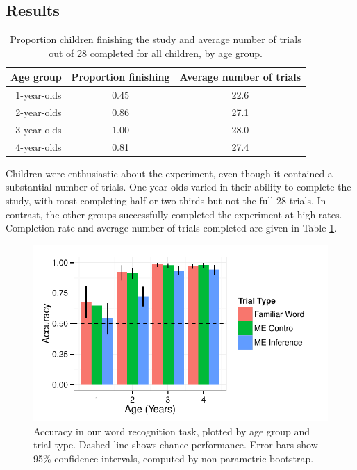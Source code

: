 \documentclass[man,noapacite]{apa2}
\begin{document}
\subsection{Results}


\begin{table}[t]
\centering
\caption{Proportion children finishing the study and average number of trials out of 28 completed for all children, by age group.\label{tab:completion}}

\begin{tabular}{rcc}
  \hline
Age group & Proportion finishing & Average number of trials \\ 
  \hline
1-year-olds & 0.45 & 22.6 \\ 
2-year-olds & 0.86 & 27.1 \\ 
3-year-olds & 1.00 & 28.0 \\ 
4-year-olds & 0.81 & 27.4 \\ 
   \hline
\end{tabular}
\end{table}

Children were enthusiastic about the experiment, even though it contained a substantial number of trials. One-year-olds varied in their ability to complete the study, with most completing half or two thirds but not the full 28 trials. In contrast, the other groups successfully completed the experiment at high rates. Completion rate and average number of trials completed are given in Table \ref{tab:completion}.

\begin{figure}[t] 
  \begin{center} 
    \includegraphics[width=5in]{figures/accuracy.pdf} 
    \caption{\label{fig:accuracy} Accuracy in our word recognition task, plotted by age group and trial type. Dashed line shows chance performance. Error bars show 95\% confidence intervals, computed by non-parametric bootstrap. }
  \end{center} 
\end{figure}
\end{document}

